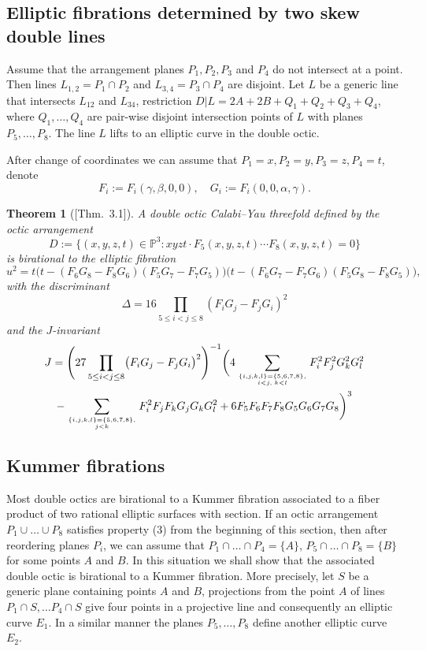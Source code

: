 \documentclass[12pt]{amsart}
\theoremstyle{plain}
\newtheorem{theorem}{Theorem}[section]
\theoremstyle{remark}
\theoremstyle{definition}
\newcommand{\PP}{\mathbb P}
\numberwithin{table}{section}
\begin{document}
\subsection{Elliptic fibrations determined by two skew double lines}

Assume that the arrangement planes $P_{1}, P_{2}, P_{3}$ and $P_{4}$ do not intersect at a point. Then lines $L_{1,2}=P_{1}\cap P_{2}$ and $L_{3,4}=P_{3}\cap P_{4}$ are disjoint. Let $L$ be a generic line that intersects $L_{12}$ and $L_{34}$, restriction $D|L = 2A+2B+Q_{1}+Q_{2}+Q_{3}+Q_{4}$,
where $Q_{1}, \dots, Q_{4}$ are pair-wise disjoint intersection points of $L$ with planes $P_{5},\dots,P_{8}$. The line $L$ lifts to an elliptic curve in the double octic.


After change of coordinates we can  assume that $P_{1}=x, P_{2}=y, P_{3}=z, P_{4}=t$, denote
\[F_{i}:=F_{i}(\gamma,\beta,0,0), \quad G_{i}:=F_{i}(0,0,\alpha,\gamma).\]
\begin{theorem}[\mbox{\cite{CK-C2}[Thm. 3.1]}]
	A double octic Calabi--Yau threefold defined by the octic arrangement
	\[D:=\{(x,y,z,t)\in\PP^{3}: xyzt\cdot F_{5}(x,y,z,t)\cdots F_{8}(x,y,z,t)=0\}\]
	is birational to the elliptic fibration
	\begin{equation}\label{eq:gen2}
		u^{2}=t\biggl(t-(F_{6} G_{8} - F_{8} G_{6}) (F_{5} G_{7} - F_{7} G_{5})\biggr) \biggl(t-(F_{6} G_{7} - F_{7} G_{6})
		(F_{5} G_{8} - F_{8} G_{5})\biggr),
	\end{equation}
	with the discriminant
	\[
	\Delta=16\prod_{5\le i<j\le8}(F_{i}G_{j}-F_{j}G_{i})^{2}
	\]
	and the $J$-invariant
	\begin{multline*}
		J=	\Biggl(27 \prod\limits_{5\le i<j\le8}\bigl(F_{i}G_{j}-F_{j}G_{i}\bigr)^{2}\Biggr)^{-1}
		\biggl(4\sum\limits_{\{i,j,k,l\}=\{5,6,7,8\},\atop i<j,\; k<l}F_{i}^{2}F_{j}^{2}G_{k}^{2}G_{l}^{2}\\
		-\sum\limits_{\{i,j,k,l\}=\{5,6,7,8\},\atop j<k} F_{i}^{2}F_{j}F_{k}G_{j}G_{k}G_{l}^{2}
		+6 {F_5} {F_6} {F_7} {F_8} {G_5} {G_6} {G_7} {G_8}
		\biggr)^{3}
	\end{multline*}
\end{theorem}


\subsection{Kummer fibrations}\label{sec:kumfibr}

Most double octics are birational to a Kummer fibration associated to a fiber product of two rational elliptic surfaces with section. If an octic arrangement $P_{1}\cup\dots\cup P_{8}$ satisfies property (3) from the beginning of this section, then after reordering planes $P_{i}$, we can assume that $P_{1}\cap \dots\cap P_{4}=\{A\}$, $P_{5}\cap\dots\cap P_{8}=\{B\}$  for some points $A$ and $B$. In this situation we shall show that the associated double octic  is birational to a Kummer fibration. More precisely, let $S$ be a generic plane containing points $A$ and $B$, projections from the point $A$ of lines $P_1\cap S,\dots P_4\cap S$ give four points in a projective line and consequently an elliptic curve $E_{1}$. In a similar manner the planes $P_{5},\dots,P_{8}$ define another elliptic curve $E_{2}$.
\end{document}
